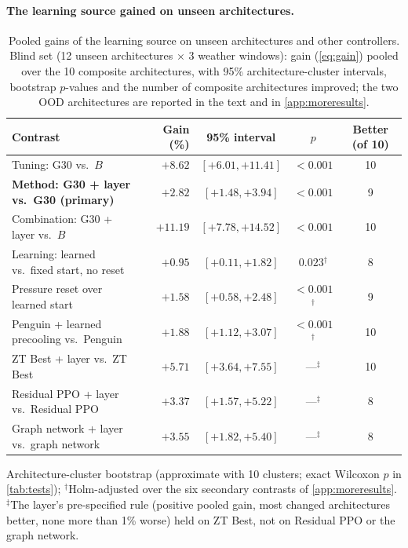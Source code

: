 \documentclass{article}
\begin{document}
\paragraph{The learning source gained on unseen architectures.}\label{sec:learningresults}
\begin{table}[b]
\centering
\begin{threeparttable}
\caption{Pooled gains of the learning source on unseen architectures and other controllers. Blind set (12
unseen architectures $\times$ 3 weather windows): gain (\cref{eq:gain}) pooled over the 10 composite
architectures, with 95\% architecture-cluster intervals, bootstrap $p$-values and the number of composite
architectures improved; the two OOD architectures are reported in the text and in \cref{app:moreresults}.}
\label{tab:learning}
\small
\begin{tabular}{lrccc}
\toprule
Contrast & Gain (\%) & 95\% interval & $p$\tnote{a} & Better (of 10)\\
\midrule
Tuning: G30 vs.\ $B$ & $+8.62$ & $[+6.01, +11.41]$ & $<0.001$ & 10\\
\textbf{Method: G30 + layer vs.\ G30 (primary)} & $\mathbf{+2.82}$ & $[+1.48, +3.94]$ & $<0.001$ & 9\\
Combination: G30 + layer vs.\ $B$ & $+11.19$ & $[+7.78, +14.52]$ & $<0.001$ & 10\\
Learning: learned vs.\ fixed start, no reset & $+0.95$ & $[+0.11, +1.82]$ & $0.023$$^{\dagger}$ & 8\\
Pressure reset over learned start & $+1.58$ & $[+0.58, +2.48]$ & $<0.001$$^{\dagger}$ & 9\\
Penguin + learned precooling vs.\ Penguin & $+1.88$ & $[+1.12, +3.07]$ & $<0.001$$^{\dagger}$ & 10\\
ZT Best + layer vs.\ ZT Best & $+5.71$ & $[+3.64, +7.55]$ & ---$^{\ddagger}$ & 10\\
Residual PPO + layer vs.\ Residual PPO & $+3.37$ & $[+1.57, +5.22]$ & ---$^{\ddagger}$ & 8\\
Graph network + layer vs.\ graph network & $+3.55$ & $[+1.82, +5.40]$ & ---$^{\ddagger}$ & 8\\
\bottomrule
\end{tabular}
\begin{tablenotes}\footnotesize
\item[a] Architecture-cluster bootstrap (approximate with 10 clusters; exact Wilcoxon $p$ in \cref{tab:tests});
$^\dagger$Holm-adjusted over the six secondary contrasts of \cref{app:moreresults}. $^\ddagger$The layer's
pre-specified rule (positive pooled gain, most changed architectures better, none more than 1\% worse) held on ZT Best, not on
Residual PPO or the graph network.
\end{tablenotes}
\end{threeparttable}
\end{table}
\end{document}

